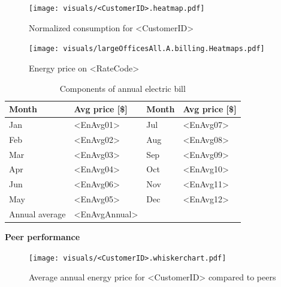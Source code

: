 \documentclass[11pt]{article}
\begin{document}
\pagestyle{energy}

\begin{figure}[!h]
\centering
\texttt{[image: visuals/<CustomerID>.heatmap.pdf]}
\caption{Normalized consumption for <CustomerID>}
\label{fig:heatmap}
\end{figure}

\begin{figure}[!h]
\centering
\texttt{[image: visuals/largeOfficesAll.A.billing.Heatmaps.pdf]}
\caption{Energy price on <RateCode>}
\label{fig:toumap}
\end{figure}

\lipsum[1][1-7]

\begin{table}[th!]
  \centering
  \caption{Components of annual electric bill}
  \vspace{1.5ex}
  \label{tab:annual}
  \begin{tabular}{llll}
    Month & Avg price [\$] & Month & Avg price [\$] \\
    \midrule
    Jan & <EnAvg01> & Jul & <EnAvg07> \\
    Feb & <EnAvg02> & Aug & <EnAvg08> \\
    Mar & <EnAvg03> & Sep & <EnAvg09> \\
    Apr & <EnAvg04> & Oct & <EnAvg10> \\
    Jun & <EnAvg06> & Nov & <EnAvg11> \\
    May & <EnAvg05> & Dec & <EnAvg12> \\
    \midrule
    Annual average & <EnAvgAnnual>
  \end{tabular}
\end{table}

\vspace{3ex}
\textbf{\Large Peer performance}
\vspace{1ex}

\lipsum[1][1-7]

\begin{figure}[!h]
\centering
\texttt{[image: visuals/<CustomerID>.whiskerchart.pdf]}
\caption{Average annual energy price for <CustomerID> compared to peers}
\label{fig:PeerCompEn}
\end{figure}

\clearpage

\pagestyle{demand}
\lipsum[1][1-7]
\end{document}
